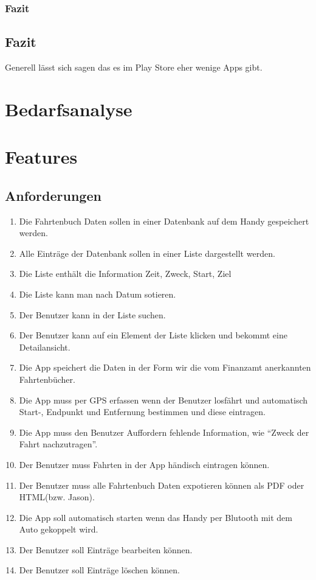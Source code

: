\documentclass[a4paper]{article}
\begin{document}
\subsubsection{Fazit}

\subsection{Fazit}
Generell lässt sich sagen das es im Play Store eher wenige Apps gibt.

\section{Bedarfsanalyse}

\section{Features}
\subsection{Anforderungen}
\begin{enumerate}
	\item Die Fahrtenbuch Daten sollen in einer Datenbank auf dem Handy gespeichert werden.
	\item Alle Einträge der Datenbank sollen in einer Liste dargestellt werden.
	\item Die Liste enthält die Information Zeit, Zweck, Start, Ziel
	\item Die Liste kann man nach Datum sotieren.
	\item Der Benutzer kann in der Liste suchen.
	\item Der Benutzer kann auf ein Element der Liste klicken und bekommt eine Detailansicht.
	\item Die App speichert die Daten in der Form wir die vom Finanzamt anerkannten Fahrtenbücher.
	\item Die App muss per GPS erfassen wenn der Benutzer losfährt und automatisch Start-, Endpunkt und Entfernung bestimmen und diese eintragen.
	\item Die App muss den Benutzer Auffordern fehlende Information, wie \enquote{Zweck der Fahrt nachzutragen}.
	\item Der Benutzer muss Fahrten in der App händisch eintragen können.
	\item Der Benutzer muss alle Fahrtenbuch Daten expotieren können als PDF oder HTML(bzw. Jason).
	\item Die App soll automatisch starten wenn das Handy per Blutooth mit dem Auto gekoppelt wird.
	\item Der Benutzer soll Einträge bearbeiten können.
	\item Der Benutzer soll Einträge löschen können.
\end{enumerate}
\end{document}

